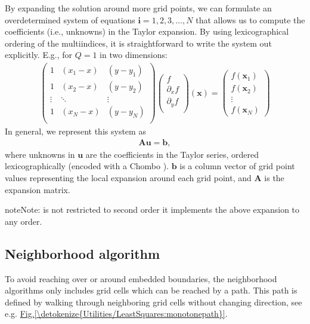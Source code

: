 \documentclass[letterpaper,10pt,english]{sphinxmanual}
\begin{document}
By expanding the solution around more grid points, we can formulate an over\sphinxhyphen{}determined system of equations \(\mathbf{i} = 1, 2, 3, \ldots, N\) that allows us to compute the coefficients (i.e., unknowns) in the Taylor expansion.
By using lexicographical ordering of the multi\sphinxhyphen{}indices, it is straightforward to write the system out explicitly.
E.g., for \(Q = 1\) in two dimensions:
\begin{equation*}
\begin{split}\begin{pmatrix}
1 & (x_1 - x) & (y - y_1) \\
1 & (x_2 - x) & (y - y_2) \\
\vdots & \ddots & \vdots \\
1 & (x_N - x) & (y - y_N) \\
\end{pmatrix}
\begin{pmatrix}
f            \\
\partial_x f \\
\partial_y f \\
\end{pmatrix}(\mathbf{x})
=
\begin{pmatrix}
f(\mathbf{x}_1) \\
f(\mathbf{x}_2) \\
\vdots \\
f(\mathbf{x}_N)
\end{pmatrix}\end{split}
\end{equation*}
In general, we represent this system as
\begin{equation*}
\begin{split}\mathbf{A}\mathbf{u} = \mathbf{b},\end{split}
\end{equation*}
where unknowns in \(\mathbf{u}\) are the coefficients in the Taylor series, ordered lexicographically (encoded with a Chombo ).
\(\mathbf{b}\) is a column vector of grid point values representing the local expansion around each grid point, and \(\mathbf{A}\) is the expansion matrix.

\begin{sphinxadmonition}{note}{Note:}
 is not restricted to second order \textendash{} it implements the above expansion to any order.
\end{sphinxadmonition}


\subsection{Neighborhood algorithm}
\label{\detokenize{Utilities/LeastSquares:neighborhood-algorithm}}
To avoid reaching over or around embedded boundaries, the neighborhood algorithms only includes grid cells which can be reached by a  path.
This path is defined by walking through neighboring grid cells without changing direction, see e.g. \hyperref[\detokenize{Utilities/LeastSquares:monotonepath}]{Fig.\@ \ref{\detokenize{Utilities/LeastSquares:monotonepath}}}.
\end{document}
